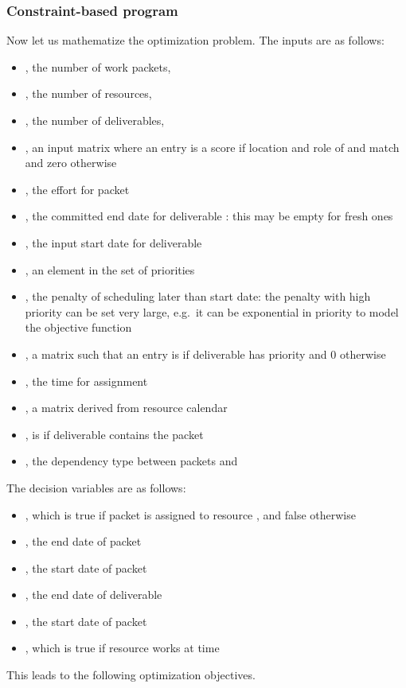 \documentclass[10pt,journal,cspaper,compsoc]{IEEEtran}
\begin{document}
\subsubsection{Constraint-based program}
Now let us mathematize the optimization problem.  The inputs are as follows:
\begin{itemize}
  \item , the number of work packets, 
  \item , the number of resources, 
  \item , the number of deliverables, 
  \item , an input matrix where an entry is a score if location and role of  and  match and zero otherwise
  \item , the effort for packet 
  \item , the committed end date for deliverable : this may be empty for fresh ones
  \item , the input start date for deliverable 
  \item , an element in the set of priorities
  \item , the penalty of scheduling later than start date: the penalty with high priority can be set very large, e.g.\ it can be exponential in priority to model the objective function
  \item , a matrix such that an entry is  if deliverable  has priority  and 0 otherwise
  \item , the time for assignment
  \item , a matrix derived from resource calendar
  \item , is  if deliverable  contains the packet 
  \item , the dependency type between packets  and 
\end{itemize}
The decision variables are as follows:
\begin{itemize}
  \item , which is true if packet  is assigned to resource , and false otherwise
  \item , the end date of packet 
  \item , the start date of packet 
  \item , the end date of deliverable 
  \item , the start date of packet 
  \item , which is true if resource  works at time 
\end{itemize}

This leads to the following optimization objectives.
\end{document}
